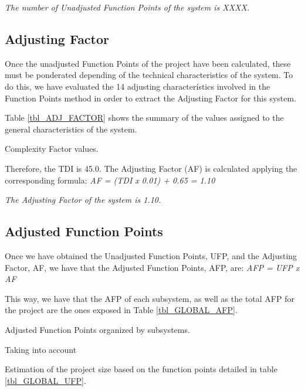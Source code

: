 \emph{The number of Unadjusted Function Points of the system is XXXX.}


\subsection{Adjusting Factor}
Once the unadjusted Function Points of the project have been calculated, these must be ponderated depending of the technical characteristics of the system. To do this, we have evaluated the 14 adjusting characterístics involved in the Function Points method in order to extract the Adjusting Factor for this system.

Table \ref{tbl_ADJ_FACTOR} shows the summary of the values assigned to the general characteristics of the system.

\begin{table}[hbtp]
\centering

\caption{Complexity Factor values.}
\label{tbl_ADJ_FACTOR}
\end{table}

Therefore, the TDI is 45.0. The Adjusting Factor (AF) is calculated applying the corresponding formula:
\emph{AF = (TDI x 0.01) + 0.65 = 1.10}

\emph{The Adjusting Factor of the system is 1.10.}

\subsection{Adjusted Function Points}
Once we have obtained the Unadjusted Function Points, UFP, and the Adjusting Factor, AF, we have that the Adjusted Function Points, AFP, are:
\emph{AFP = UFP x AF}

This way, we have that the AFP of each subsystem, as well as the total AFP for the project are the ones exposed in Table \ref{tbl_GLOBAL_AFP}.

\begin{table}[hbtp]
\centering

\caption{Adjusted Function Points organized by subsystems.}
\label{tbl_GLOBAL_AFP}
\end{table}



Taking into account 


\begin{table}[hbtp]
\centering

\caption{Estimation of the project size based on the function points detailed in table \ref{tbl_GLOBAL_UFP}.}
\label{tbl_FPEstimation}
\end{table}

